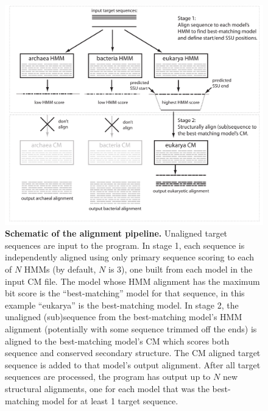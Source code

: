 \begin{figure}
  \begin{center}
\includegraphics[width=6.5in]{Figures/ssualign-schematic}
  \end{center}
\caption{\textbf{Schematic of the  alignment
    pipeline.} Unaligned target sequences are input to the
  program. In stage 1, each sequence is independently aligned
  using only primary sequence scoring to each of $N$ HMMs (by
  default, $N$ is 3), one built from each model in the input
  CM file. The model whose HMM alignment has the maximum bit
  score is the ``best-matching'' model for that sequence, in
  this example ``eukarya'' is the best-matching model. In
  stage 2, the unaligned (sub)sequence from the best-matching
  model's HMM alignment (potentially with some sequence
  trimmed off the ends) is aligned to the best-matching
  model's CM which scores both sequence and conserved
  secondary structure. The CM aligned target sequence is added
  to that model's output alignment. After all target sequences
  are processed, the program has output up to $N$ new
  structural alignments, one for each model that was the
  best-matching model for at least 1 target sequence.}
\label{fig:strategy}
\end{figure}
